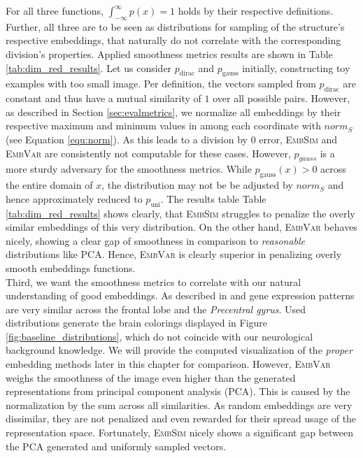 \documentclass[]{article}
\begin{document}
For all three functions, $\int_{-\infty}^{\infty}p(x)=1$ holds by their respective definitions. \\

Further, all three are to be seen as distributions for sampling of the structure's respective embeddings, that naturally do not correlate with the corresponding division's properties. Applied smoothness metrics results are shown in Table \ref{tab:dim_red_results}. Let us consider $p_\text{dirac}$ and $p_\text{gauss}$ initially, constructing toy examples with too small image. Per definition, the vectors sampled from $p_\text{dirac}$ are constant and thus have a mutual similarity of $1$ over all possible pairs. However, as described in Section \ref{sec:evalmetrics}, we normalize all embeddings by their respective maximum and minimum values in among each coordinate with $norm_S$ (see Equation \ref{equ:norm}). As this leads to a division by 0 error, \textsc{EmbSim} and \textsc{EmbVar} are consistently not computable for these cases. 
However, $p_{gauss}$ is a more sturdy adversary for the smoothness metrics. While $p_\text{gauss}(x)>0$ across the entire domain of $x$, the distribution may not be be adjusted by $norm_S$ and hence approximately reduced to $p_\text{uni}$. The results table Table \ref{tab:dim_red_results} shows clearly, that \textsc{EmbSim} struggles to penalize the overly similar embeddings of this very distribution. On the other hand, \textsc{EmbVar} behaves nicely, showing a clear gap of smoothness in comparison to \textit{reasonable} distributions like PCA. Hence, \textsc{EmbVar} is clearly superior in penalizing overly smooth embeddings functions.\\

Third, we want the smoothness metrics to correlate with our natural understanding of good embeddings. As described in \citet{ValkShapingBrainStructure2020} and \citet{Partel2020} gene expression patterns are very similar across the frontal lobe and the \textit{Precentral gyrus}. Used distributions generate the brain colorings displayed in Figure \ref{fig:baseline_distributions}, which do not coincide with our neurological background knowledge. We will provide the computed visualization of the \textit{proper} embedding methods later in this chapter for comparison. However, \textsc{EmbVar} weighs the smoothness of the image even higher than the generated representations from principal component analysis (PCA). This is caused by the normalization by the sum across all similarities. As random embeddings are very dissimilar, they are not penalized and even rewarded for their spread usage of the representation space. Fortunately, \textsc{EmbSim} nicely shows a significant gap between the PCA generated and uniformly sampled vectors.\\
\end{document}

